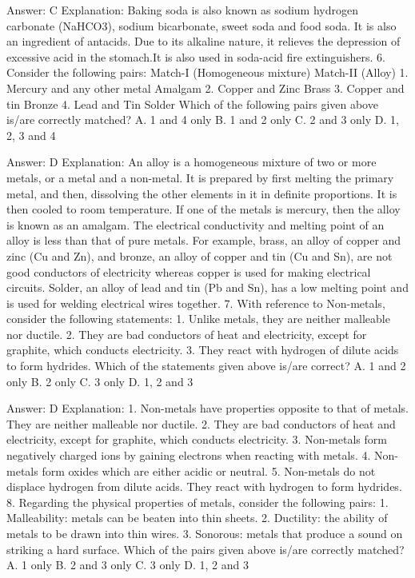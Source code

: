 Answer: C
Explanation: Baking soda is also known as sodium hydrogen carbonate (NaHCO3), sodium bicarbonate, sweet soda and food soda. It is also an ingredient of antacids. Due to its alkaline nature, it relieves the depression of excessive acid in the stomach.It is also used in soda-acid fire extinguishers. 6. Consider the following pairs: Match-I (Homogeneous mixture) Match-II (Alloy) 1. Mercury and any other metal Amalgam 2. Copper and Zinc Brass 3. Copper and tin Bronze 4. Lead and Tin Solder Which of the following pairs given above is/are correctly matched? A. 1 and 4 only B. 1 and 2 only C. 2 and 3 only D. 1, 2, 3 and 4 

Answer: D
Explanation: An alloy is a homogeneous mixture of two or more metals, or a metal and a non-metal. It is prepared by first melting the primary metal, and then, dissolving the other elements in it in definite proportions. It is then cooled to room temperature. If one of the metals is mercury, then the alloy is known as an amalgam. The electrical conductivity and melting point of an alloy is less than that of pure metals. For example, brass, an alloy of copper and zinc (Cu and Zn), and bronze, an alloy of copper and tin (Cu and Sn), are not good conductors of electricity whereas copper is used for making electrical circuits. Solder, an alloy of lead and tin (Pb and Sn), has a low melting point and is used for welding electrical wires together. 7. With reference to Non-metals, consider the following statements: 1. Unlike metals, they are neither malleable nor ductile. 2. They are bad conductors of heat and electricity, except for graphite, which conducts electricity. 3. They react with hydrogen of dilute acids to form hydrides. Which of the statements given above is/are correct? A. 1 and 2 only B. 2 only C. 3 only D. 1, 2 and 3 

Answer: D
Explanation: 1. Non-metals have properties opposite to that of metals. They are neither malleable nor ductile. 2. They are bad conductors of heat and electricity, except for graphite, which conducts electricity. 3. Non-metals form negatively charged ions by gaining electrons when reacting with metals. 4. Non-metals form oxides which are either acidic or neutral. 5. Non-metals do not displace hydrogen from dilute acids. They react with hydrogen to form hydrides. 8. Regarding the physical properties of metals, consider the following pairs: 1. Malleability: metals can be beaten into thin sheets. 2. Ductility: the ability of metals to be drawn into thin wires. 3. Sonorous: metals that produce a sound on striking a hard surface. Which of the pairs given above is/are correctly matched? A. 1 only B. 2 and 3 only C. 3 only D. 1, 2 and 3 

